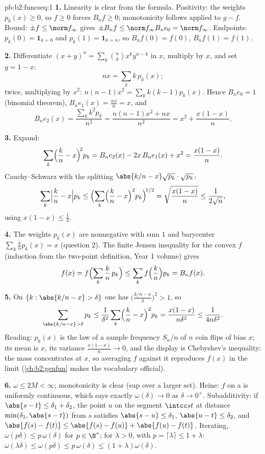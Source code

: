 \begin{solution}{pb:b2:funcseq:1}
\textbf{1.} Linearity is clear from the formula. Positivity:
the weights $p_k(x) \geq 0$, so $f \geq 0$ forces $B_nf \geq
0$; monotonicity follows applied to $g - f$. Bound: $\pm f \leq
\norm f_\infty$ gives $\pm B_nf \leq \norm f_\infty B_ne_0 =
\norm f_\infty$. Endpoints: $p_k(0) = \mathbf 1_{k=0}$ and
$p_k(1) = \mathbf 1_{k=n}$, so $B_nf(0) = f(0)$, $B_nf(1) =
f(1)$.

\textbf{2.} Differentiate $(x+y)^n = \sum_k\binom nk x^ky^{n-k}$
in $x$, multiply by $x$, and set $y = 1 - x$:
\[
nx = \sum_k k\,p_k(x) ;
\]
twice, multiplying by $x^2$: $n(n-1)x^2 = \sum_k k(k-1)p_k(x)$.
Hence $B_ne_0 = 1$ (binomial theorem), $B_ne_1(x) =
\frac{nx}{n} = x$, and
\[
B_ne_2(x) = \frac{\sum_k k^2p_k}{n^2}
= \frac{n(n-1)x^2 + nx}{n^2}
= x^2 + \frac{x(1-x)}{n} .
\]

\textbf{3.} Expand:
\[
\sum_k\Bigl(\frac kn - x\Bigr)^{\!2} p_k
= B_ne_2(x) - 2x\,B_ne_1(x) + x^2
= \frac{x(1-x)}{n} .
\]
Cauchy--Schwarz with the splitting $\abs{k/n - x}\sqrt{p_k}
\cdot \sqrt{p_k}$:
\[
\sum_k\Bigl|\frac kn - x\Bigr| p_k
\leq \Bigl(\sum_k\Bigl(\frac kn - x\Bigr)^2
p_k\Bigr)^{\!1/2}
= \sqrt{\frac{x(1-x)}{n}} \leq \frac{1}{2\sqrt n},
\]
using $x(1-x) \leq \frac14$.

\textbf{4.} The weights $p_k(x)$ are nonnegative with sum $1$
and barycenter $\sum_k \frac kn p_k(x) = x$ (question 2). The
finite Jensen inequality for the convex $f$ (induction from the
two-point definition, Year 1 volume) gives
\[
f(x) = f\Bigl(\sum_k \frac kn\,p_k\Bigr)
\leq \sum_k f\Bigl(\frac kn\Bigr)p_k = B_nf(x) .
\]

\textbf{5.} On $\{k : \abs{k/n - x} > \delta\}$ one has
$\bigl(\frac{k/n - x}{\delta}\bigr)^2 > 1$, so
\[
\sum_{\abs{k/n-x}>\delta} p_k
\leq \frac{1}{\delta^2}\sum_k\Bigl(\frac kn -
x\Bigr)^2p_k
= \frac{x(1-x)}{n\delta^2} \leq \frac{1}{4n\delta^2} .
\]
Reading: $p_k(x)$ is the law of a sample frequency $S_n/n$ of
$n$ coin flips of bias $x$; its mean is $x$, its variance
$\frac{x(1-x)}n \to 0$, and the display is Chebyshev's
inequality: the mass concentrates at $x$, so averaging $f$
against it reproduces $f(x)$ in the limit
(\cref{ch:b2:genfun} makes the vocabulary official).

\textbf{6.} $\omega \leq 2M < \infty$; monotonicity is clear
(sup over a larger set). Heine: $f$  on a  is
uniformly continuous, which says exactly $\omega(\delta) \to 0$
as $\delta \to 0^+$. Subadditivity: if $\abs{s - t} \leq
\delta_1 + \delta_2$, the point $u$ on the segment $\intcc st$
at distance $\min(\delta_1, \abs{s-t})$ from $s$ satisfies
$\abs{s-u} \leq \delta_1$, $\abs{u-t} \leq \delta_2$, and
$\abs{f(s)-f(t)} \leq \abs{f(s)-f(u)} + \abs{f(u)-f(t)}$.
Iterating, $\omega(p\delta) \leq p\,\omega(\delta)$ for $p \in
\N^*$; for $\lambda > 0$, with $p = \lceil\lambda\rceil \leq 1
+ \lambda$: $\omega(\lambda\delta) \leq \omega(p\delta) \leq
p\,\omega(\delta) \leq (1+\lambda)\omega(\delta)$.


\end{solution}
